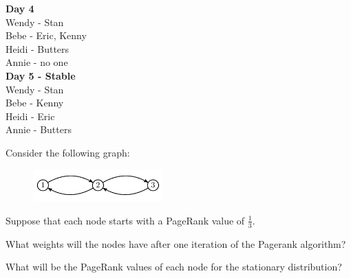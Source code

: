 \documentclass[12pt,twoside]{article}
\begin{document}
\begin{problem}{10}
{\textbf{Day 4}\\
Wendy - Stan\\
Bebe - Eric, Kenny\\
Heidi - Butters\\
Annie - no one\\

\textbf{Day 5 - Stable}\\
Wendy - Stan\\
Bebe - Kenny\\
Heidi - Eric\\
Annie - Butters\\
}

\eparts
\end{problem}



\newpage


\begin{problem}{10}
Consider the following graph:

\begin{figure}[!ht]
\begin{center}
\includegraphics[width=5cm]{PageRankGraph.pdf}\end{center}
\end{figure}

Suppose that each node starts with a PageRank value of $\frac{1}{3}$.  

\bparts
{} What weights will the nodes have after one iteration of the Pagerank algorithm?


 What will be the PageRank values of each node for the stationary distribution?

\eparts

\end{problem}
\end{document}
